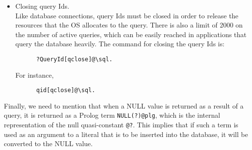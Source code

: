 \begin{itemize}
  For frequent queries that are known in advance, a two-step process is
  used. First, the query is \emph{prepared} (i.e., compiled and optimized)
  and then \emph{executed}. The preparation and execution of such queries
  allows certain level of flexibility by letting the user to place question
  marks \texttt{?} in lieu of some of the constants (these cannot be column
  names, table names, variable names, etc. --- only regular constants).
  These question marks can be replaced by actual constants at the query
  execution time.
  \begin{itemize}
  \item    \texttt{?ConnectId[prepare(?QueryId,?QueryList)]@\bs{}sql.} \\
    The meaning of the parameters is the same as before.

    Example:
\begin{verbatim}
      id1[prepare(qid,['SELECT T.addr FROM ', Person,
                       ' T where T.name = ? and T.age = ?']
                 )
         ]@\sql.    
\end{verbatim}
    The query Id \texttt{qid} can then be used to execute the above query,
    as shown below. 
    \item  \texttt{?QueryId[execute(?BindList,?ReturnList)]@\bs{}sql.} \\
      \texttt{?QueryId} must be bound to the query Id of a previously
      prepared query. \texttt{?BindList} must be a list of values that
      is supposed to be substituted for the \texttt{?}'s in the
      \texttt{prepare} command; the \texttt{?}'s are substituted in the
      order in which they appear in the \texttt{prepare} statement.
    
      Example:
\begin{verbatim}
       qid[execute([mike,44],[?Address])]@\sql.      
\end{verbatim}
  \end{itemize}
  \item Closing query Ids.\\
    Like database connections, query Ids must be closed in order to release
    the resources that the OS allocates to the query. There is also a limit of
    2000 on the number of active queries, which can be easily reached in
    applications that query the database heavily. The command for closing the
    query Ids is:
\begin{verbatim}
      ?QueryId[qclose]@\sql.    
\end{verbatim}
    For instance,
\begin{verbatim}
      qid[qclose]@\sql.    
\end{verbatim}
\end{itemize}
Finally, we need to mention that when a NULL value is returned as a result
of a query, it is returned as a Prolog term \texttt{NULL(?)@\bs{}plg},
which is the internal representation of the \FLSYSTEM null quasi-constant
\texttt{\bs{}@?}. 
This implies that if such a term is used as an argument to a
literal that is to be inserted into the database, it
will be converted to the NULL value.


